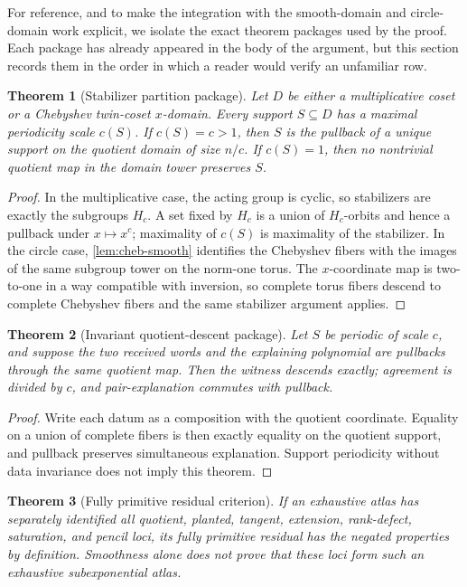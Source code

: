 \documentclass[12pt,a4paper]{amsart}
\numberwithin{equation}{section}
\newtheorem{theorem}{Theorem}[section]
\theoremstyle{remark}
\begin{document}
For reference, and to make the integration with the smooth-domain and circle-domain work explicit, we isolate the exact theorem packages used by the proof.  Each package has already appeared in the body of the argument, but this section records them in the order in which a reader would verify an unfamiliar row.

\begin{theorem}[Stabilizer partition package]\label{thm:stabilizer-package}
Let \(D\) be either a multiplicative coset or a Chebyshev twin-coset \(x\)-domain.  Every support \(S\subseteq D\) has a maximal periodicity scale \(c(S)\).  If \(c(S)=c>1\), then \(S\) is the pullback of a unique support on the quotient domain of size \(n/c\).  If \(c(S)=1\), then no nontrivial quotient map in the domain tower preserves \(S\).
\end{theorem}

\begin{proof}
In the multiplicative case, the acting group is cyclic, so stabilizers are exactly the subgroups \(H_c\).  A set fixed by \(H_c\) is a union of \(H_c\)-orbits and hence a pullback under \(x\mapsto x^c\); maximality of \(c(S)\) is maximality of the stabilizer.  In the circle case, \cref{lem:cheb-smooth} identifies the Chebyshev fibers with the images of the same subgroup tower on the norm-one torus.  The \(x\)-coordinate map is two-to-one in a way compatible with inversion, so complete torus fibers descend to complete Chebyshev fibers and the same stabilizer argument applies.
\end{proof}

\begin{theorem}[Invariant quotient-descent package]\label{thm:exact-descent-package}
Let \(S\) be periodic of scale \(c\), and suppose the two received words
and the explaining polynomial are pullbacks through the same quotient map.
Then the witness descends exactly; agreement is divided by \(c\), and
pair-explanation commutes with pullback.
\end{theorem}

\begin{proof}
Write each datum as a composition with the quotient coordinate.  Equality
on a union of complete fibers is then exactly equality on the quotient
support, and pullback preserves simultaneous explanation.  Support
periodicity without data invariance does not imply this theorem.
\end{proof}

\begin{theorem}[Fully primitive residual criterion]\label{thm:aperiodic-package}
If an exhaustive atlas has separately identified all quotient, planted,
tangent, extension, rank-defect, saturation, and pencil loci, its
\emph{fully primitive residual} has the negated properties by definition.
Smoothness alone does not prove
that these loci form such an exhaustive subexponential atlas.
\end{theorem}
\end{document}
